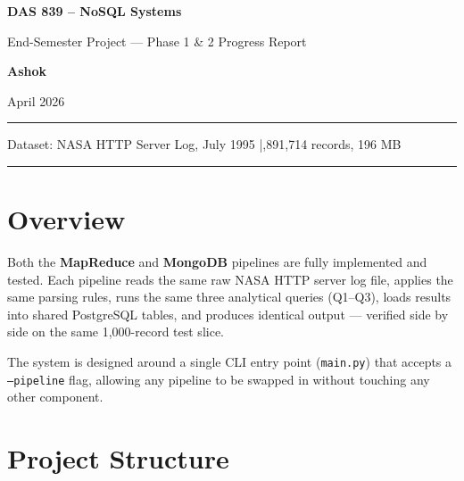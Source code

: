 \documentclass[12pt,a4paper]{article}
\begin{document}
\begin{titlepage}
  \centering
  \vspace*{2cm}
  {\LARGE\bfseries DAS 839 -- NoSQL Systems\par}
  \vspace{0.5cm}
  {\large End-Semester Project --- Phase 1 \& 2 Progress Report\par}
  \vspace{2cm}
  {\large\bfseries Ashok\par}
  \vspace{0.5cm}
  {\normalsize April 2026\par}
  \vspace{3cm}
  \hrule
  \vspace{0.4cm}
  {\small
    Dataset: NASA HTTP Server Log, July 1995 \quad|,891,714 records, 196 MB
  }
  \vspace{0.4cm}
  \hrule
\end{titlepage}

\tableofcontents
\newpage

\section{Overview}

Both the \textbf{MapReduce} and \textbf{MongoDB} pipelines are fully implemented and tested.
Each pipeline reads the same raw NASA HTTP server log file, applies the same parsing rules,
runs the same three analytical queries (Q1--Q3), loads results into shared PostgreSQL tables,
and produces identical output --- verified side by side on the same 1,000-record test slice.

The system is designed around a single CLI entry point (\texttt{main.py}) that accepts a
\texttt{--pipeline} flag, allowing any pipeline to be swapped in without touching any other
component.

\section{Project Structure}
\end{document}
